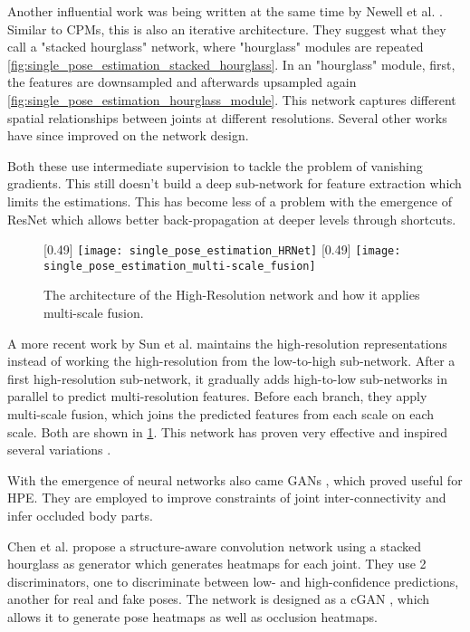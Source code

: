 Another influential work was being written at the same time by Newell et al. \cite{Newell2016}.
Similar to \gls{CPMs}, this is also an iterative architecture.
They suggest what they call a "stacked hourglass" network, where "hourglass" modules are repeated \ref{fig:single_pose_estimation_stacked_hourglass}.
In an "hourglass" module, first, the features are downsampled and afterwards upsampled again \ref{fig:single_pose_estimation_hourglass_module}.
This network captures different spatial relationships between joints at different resolutions.
Several other works \cite{Yang2017}\cite{Yu2017}\cite{Chou17} have since improved on the network design.

Both these use intermediate supervision to tackle the problem of vanishing gradients.
This still doesn't build a deep sub-network for feature extraction which limits the estimations.
This has become less of a problem with the emergence of \gls{ResNet}\cite{He2015} which allows better back-propagation at deeper levels through shortcuts.

\begin{figure}
	\centering
	[0.49\textwidth]{%
		\texttt{[image: single\_pose\_estimation\_HRNet]}%
	}
	[0.49\textwidth]{%
		\texttt{[image: single\_pose\_estimation\_multi-scale\_fusion]}%
	}
	\caption{
		The architecture of the High-Resolution network and how it applies multi-scale fusion.\cite{Sun2019}
	}
	\label{fig:HRNet}
\end{figure}

A more recent work by Sun et al. \cite{Sun2019} maintains the high-resolution representations instead of working the high-resolution from the low-to-high sub-network.
After a first high-resolution sub-network, it gradually adds high-to-low sub-networks in parallel to predict multi-resolution features.
Before each branch, they apply multi-scale fusion, which joins the predicted features from each scale on each scale.
Both are shown in \ref{fig:HRNet}.
This network has proven very effective and inspired several variations \cite{Cheng2019}\cite{Yu2021}\cite{Yuan2021}.

With the emergence of neural networks also came \glspl{GAN} \cite{Goodfellow2014}, which proved useful for \gls{HPE}.
They are employed to improve constraints of joint inter-connectivity and infer occluded body parts.

Chen et al. \cite{Chen2017} propose a structure-aware convolution network using a stacked hourglass as generator which generates heatmaps for each joint.
They use 2 discriminators, one to discriminate between low- and high-confidence predictions, another for real and fake poses.
The network is designed as a \gls{cGAN} \cite{Mirza2014}, which allows it to generate pose heatmaps as well as occlusion heatmaps.

